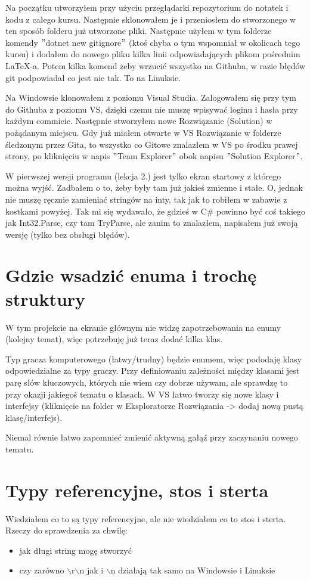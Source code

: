 \documentclass[10pt]{article}
\begin{document}
Na początku utworzyłem przy użyciu przeglądarki repozytorium do notatek i kodu z całego kursu. Następnie sklonowałem je i przeniosłem do stworzonego w ten sposób folderu już utworzone pliki. Następnie użyłem w tym folderze komendy $"$dotnet new gitignore$"$ (ktoś chyba o tym wspomniał w okolicach tego kursu) i dodałem do nowego pliku kilka linii odpowiadających plikom pośrednim LaTeX-a. Potem kilka komend żeby wrzucić wszystko na Githuba, w razie błędów git podpowiadał co jest nie tak. To na Linuksie.

Na Windowsie klonowałem z poziomu Visual Studia. Zalogowałem się przy tym do Githuba z poziomu VS, dzięki czemu nie muszę wpisywać loginu i hasła przy każdym commicie. Następnie stworzyłem nowe Rozwiązanie (Solution) w pożądanym miejscu. Gdy już miałem otwarte w VS Rozwiązanie w folderze śledzonym przez Gita, to wszystko co Gitowe znalazłem w VS po środku prawej strony, po kliknięciu w napis $"$Team Explorer$"$ obok napisu $"$Solution Explorer$"$.

W pierwszej wersji programu (lekcja 2.) jest tylko ekran startowy z którego można wyjść. Zadbałem o to, żeby były tam już jakieś zmienne i stałe. O, jednak nie muszę ręcznie zamieniać stringów na inty, tak jak to robiłem w zabawie z kostkami powyżej. Tak mi się wydawało, że gdzieś w C\# powinno być coś takiego jak Int32.Parse, czy tam TryParse, ale zanim to znalazłem, napisałem już swoją wersję (tylko bez obsługi błędów).

\section{Gdzie wsadzić enuma i trochę struktury}
W tym projekcie na ekranie głównym nie widzę zapotrzebowania na enumy (kolejny temat), więc potrzebuję już teraz dodać kilka klas.

Typ gracza komputerowego (łatwy/trudny) będzie enumem, więc pododaję klasy odpowiedzialne za typy graczy. Przy definiowaniu zależności między klasami jest parę słów kluczowych, których nie wiem czy dobrze używam, ale sprawdzę to przy okazji jakiegoś tematu o klasach. W VS łatwo tworzy się nowe klasy i interfejsy (kliknięcie na folder w Eksploratorze Rozwiązania -> dodaj nową pustą klasę/interfejs).

Niemal równie łatwo zapomnieć zmienić aktywną gałąź przy zaczynaniu nowego tematu.

\section{Typy referencyjne, stos i sterta}
Wiedziałem co to są typy referencyjne, ale nie wiedziałem co to stos i sterta. Rzeczy do sprawdzenia za chwilę:
\begin{itemize}
\item jak długi string mogę stworzyć
\item czy zarówno $\backslash$r$\backslash$n jak i $\backslash$n działają tak samo na Windowsie i Linuksie
\end{itemize}
\end{document}
